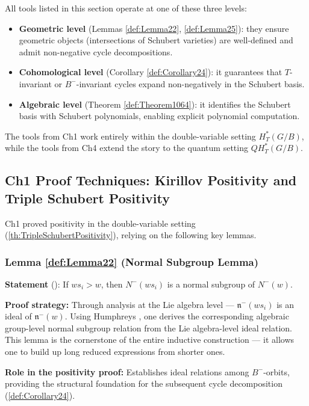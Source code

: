 All tools listed in this section operate at one of these three levels:
\begin{itemize}
    \item \textbf{Geometric level} (Lemmas \ref{def:Lemma22}, \ref{def:Lemma25}): they ensure geometric objects (intersections of Schubert varieties) are well-defined and admit non-negative cycle decompositions.
    \item \textbf{Cohomological level} (Corollary \ref{def:Corollary24}): it guarantees that $T$-invariant or $B^-$-invariant cycles expand non-negatively in the Schubert basis.
    \item \textbf{Algebraic level} (Theorem \ref{def:Theorem1064}): it identifies the Schubert basis with Schubert polynomials, enabling explicit polynomial computation.
\end{itemize}
The tools from Ch1 work entirely within the double-variable setting $H_T^*(G/B)$, while the tools from Ch4 extend the story to the quantum setting $QH_T^*(G/B)$.


\subsection{Ch1 Proof Techniques: Kirillov Positivity and Triple Schubert Positivity}
\label{sec:Ch1ProofTechniques}

Ch1 proved positivity in the double-variable setting (\cref{th:TripleSchubertPositivity}), relying on the following key lemmas.

\subsubsection{Lemma \cref{def:Lemma22} (Normal Subgroup Lemma)}
\label{sec:Lemma22Detail}

\textbf{Statement} (\cite[ Lemma 2.2]{GX2025}): If $ws_i > w$, then $N^-(ws_i)$ is a normal subgroup of $N^-(w)$.\ 

\textbf{Proof strategy:} Through analysis at the Lie algebra level --- $\mathfrak{n}^-(ws_i)$ is an ideal of $\mathfrak{n}^-(w)$. Using Humphreys \cite[Theorems 13.1, 13.3]{humphreys1975}, one derives the corresponding algebraic group-level normal subgroup relation from the Lie algebra-level ideal relation. This lemma is the cornerstone of the entire inductive construction --- it allows one to build up long reduced expressions from shorter ones.\ 

\textbf{Role in the positivity proof:} Establishes ideal relations among $B^-$-orbits, providing the structural foundation for the subsequent cycle decomposition (\cref{def:Corollary24}).\ 

